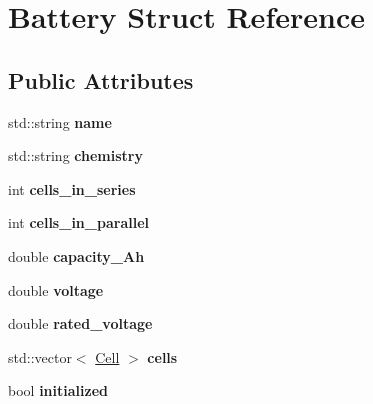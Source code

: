 \hypertarget{structBattery}{}\section{Battery Struct Reference}
\label{structBattery}
\subsection*{Public Attributes}
\begin{DoxyCompactItemize}
\item 
\mbox{\label{structBattery_a8f592cec898a5a7b2af9afa35e8cbce2}} 
std\+::string {\bfseries name}
\item 
\mbox{\label{structBattery_ab409b5aef2a2c361622bf111dc3cf443}} 
std\+::string {\bfseries chemistry}
\item 
\mbox{\label{structBattery_a7ba16885ae567afdb8a10d2496629db8}} 
int {\bfseries cells\+\_\+in\+\_\+series}
\item 
\mbox{\label{structBattery_a9232de27f00626e0c7329e8c13c670b6}} 
int {\bfseries cells\+\_\+in\+\_\+parallel}
\item 
\mbox{\label{structBattery_a83c2a82286bacbad84a144f6f6889da6}} 
double {\bfseries capacity\+\_\+\+Ah}
\item 
\mbox{\label{structBattery_a5484f98ddca2b1846c4a5eed032e83f0}} 
double {\bfseries voltage}
\item 
\mbox{\label{structBattery_a0ca2856a4d9005ceb78e8bcc37d07f82}} 
double {\bfseries rated\+\_\+voltage}
\item 
\mbox{\label{structBattery_a256bbd9e03b670fff0c479f21921d4c2}} 
std\+::vector$<$ \hyperlink{structCell}{Cell} $>$ {\bfseries cells}
\item 
\mbox{\label{structBattery_a350e92ff3da740f939e9fb2f974cab97}} 
bool {\bfseries initialized}
\item 
\mbox{\label{structBattery_a1c1b9556fa6dc6ae912198e18ccd6675}} 

\end{DoxyCompactItemize}

